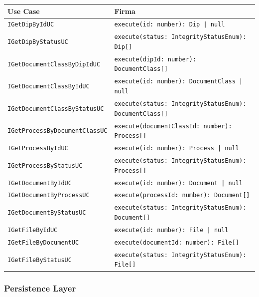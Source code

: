 \begin{table}[H]
  \centering
  \footnotesize
  \setlength{\tabcolsep}{4pt}
  \renewcommand{\arraystretch}{1.4}
  \begin{tabularx}{\textwidth}{|l|Y|}
    \hline
    \textbf{Use Case} & \textbf{Firma} \\
    \hline
    \texttt{IGetDipByIdUC} & \texttt{execute(id: number): Dip | null} \\
    \texttt{IGetDipByStatusUC} & \texttt{execute(status: IntegrityStatusEnum): Dip[]} \\
    \hline
    \texttt{IGetDocumentClassByDipIdUC} & \texttt{execute(dipId: number): DocumentClass[]} \\
    \texttt{IGetDocumentClassByIdUC} & \texttt{execute(id: number): DocumentClass | null} \\
    \texttt{IGetDocumentClassByStatusUC} & \texttt{execute(status: IntegrityStatusEnum): DocumentClass[]} \\
    \hline
    \texttt{IGetProcessByDocumentClassUC} & \texttt{execute(documentClassId: number): Process[]} \\
    \texttt{IGetProcessByIdUC} & \texttt{execute(id: number): Process | null} \\
    \texttt{IGetProcessByStatusUC} & \texttt{execute(status: IntegrityStatusEnum): Process[]} \\
    \hline
    \texttt{IGetDocumentByIdUC} & \texttt{execute(id: number): Document | null} \\
    \texttt{IGetDocumentByProcessUC} & \texttt{execute(processId: number): Document[]} \\
    \texttt{IGetDocumentByStatusUC} & \texttt{execute(status: IntegrityStatusEnum): Document[]} \\
    \hline
    \texttt{IGetFileByIdUC} & \texttt{execute(id: number): File | null} \\
    \texttt{IGetFileByDocumentUC} & \texttt{execute(documentId: number): File[]} \\
    \texttt{IGetFileByStatusUC} & \texttt{execute(status: IntegrityStatusEnum): File[]} \\
    \hline
  \end{tabularx}
  \label{tab:browsing:usecase}
\end{table}

\subsubsection{Persistence Layer}
\label{sec:browsing:repository}

